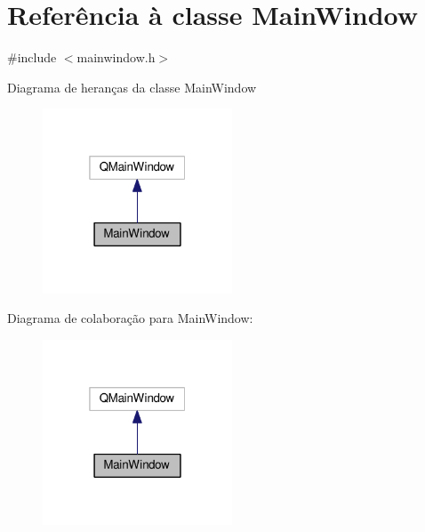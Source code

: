 \hypertarget{classMainWindow}{}\section{Referência à classe Main\+Window}
\label{classMainWindow}


{\ttfamily \#include $<$mainwindow.\+h$>$}



Diagrama de heranças da classe Main\+Window
\nopagebreak
\begin{figure}[H]
\begin{center}
\leavevmode
\includegraphics[width=160pt]{classMainWindow__inherit__graph}
\end{center}
\end{figure}


Diagrama de colaboração para Main\+Window\+:
\nopagebreak
\begin{figure}[H]
\begin{center}
\leavevmode
\includegraphics[width=160pt]{classMainWindow__coll__graph}
\end{center}
\end{figure}
